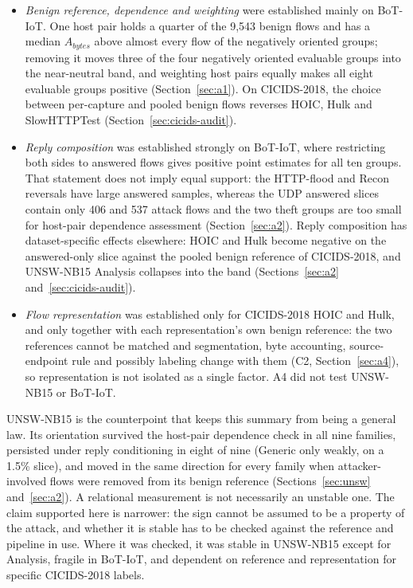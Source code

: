 \documentclass[preprint,12pt]{elsarticle}
\begin{document}
\begin{itemize}
\item \emph{Benign reference, dependence and weighting} were established mainly on BoT-IoT. One host pair holds a quarter of the 9{,}543 benign flows and has a median $A_{bytes}$ above almost every flow of the negatively oriented groups; removing it moves three of the four negatively oriented evaluable groups into the near-neutral band, and weighting host pairs equally makes all eight evaluable groups positive (Section~\ref{sec:a1}). On CICIDS-2018, the choice between per-capture and pooled benign flows reverses HOIC, Hulk and SlowHTTPTest (Section~\ref{sec:cicids-audit}).
\item \emph{Reply composition} was established strongly on BoT-IoT, where restricting both sides to answered flows gives positive point estimates for all ten groups. That statement does not imply equal support: the HTTP-flood and Recon reversals have large answered samples, whereas the UDP answered slices contain only 406 and 537 attack flows and the two theft groups are too small for host-pair dependence assessment (Section~\ref{sec:a2}). Reply composition has dataset-specific effects elsewhere: HOIC and Hulk become negative on the answered-only slice against the pooled benign reference of CICIDS-2018, and UNSW-NB15 Analysis collapses into the band (Sections~\ref{sec:a2} and~\ref{sec:cicids-audit}).
\item \emph{Flow representation} was established only for CICIDS-2018 HOIC and Hulk, and only together with each representation's own benign reference: the two references cannot be matched and segmentation, byte accounting, source-endpoint rule and possibly labeling change with them (C2, Section~\ref{sec:a4}), so representation is not isolated as a single factor. A4 did not test UNSW-NB15 or BoT-IoT.
\end{itemize}

UNSW-NB15 is the counterpoint that keeps this summary from being a general law. Its orientation survived the host-pair dependence check in all nine families, persisted under reply conditioning in eight of nine (Generic only weakly, on a 1.5\% slice), and moved in the same direction for every family when attacker-involved flows were removed from its benign reference (Sections~\ref{sec:unsw} and~\ref{sec:a2}). A relational measurement is not necessarily an unstable one. The claim supported here is narrower: the sign cannot be assumed to be a property of the attack, and whether it is stable has to be checked against the reference and pipeline in use. Where it was checked, it was stable in UNSW-NB15 except for Analysis, fragile in BoT-IoT, and dependent on reference and representation for specific CICIDS-2018 labels.
\end{document}

